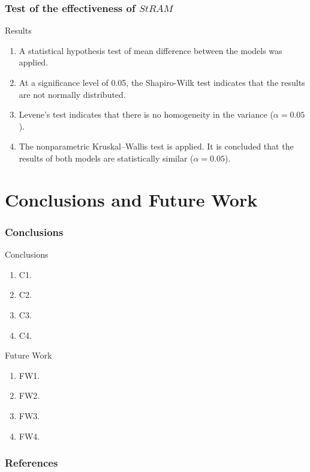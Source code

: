 \documentclass[aspectratio=169]{beamer}
\begin{document}
\begin{frame}
\frametitle{Test of the effectiveness of $StRAM$}
\begin{block}{Results}
  \begin{enumerate}
    \item A statistical hypothesis test of mean difference between the models was applied.
    \item At a significance level of 0.05, the Shapiro-Wilk test indicates that the results are not normally distributed.
    \item Levene's test indicates that there is no homogeneity in the variance ($\alpha = 0.05$).
    \item The nonparametric Kruskal–Wallis test is applied. It is concluded that the results of both models are statistically similar ($\alpha = 0.05$).
  \end{enumerate}
\end{block}
\vfill

\end{frame}

\section[Conclusions and Future Work]{Conclusions and Future Work}
\begin{frame}
\frametitle{Conclusions}
  \begin{block}{Conclusions}
    \begin{enumerate}
      \item C1.
      \item C2.
      \item C3.
      \item C4.
    \end{enumerate}
  \end{block}
  \begin{block}{Future Work}
    \begin{enumerate}
      \item FW1.
      \item FW2.
      \item FW3.
      \item FW4.
    \end{enumerate}
  \end{block}
\end{frame}

\begin{frame}[allowframebreaks]
  \frametitle{References}
  \footnotesize
  
\end{frame}
\end{document}
